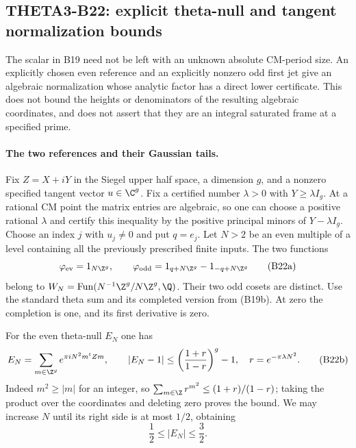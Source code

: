 \subsection{THETA3-B22: explicit theta-null and tangent normalization bounds}\label{B22}

The scalar in B19 need not be left with an unknown absolute
CM-period size.  An explicitly chosen even reference and an
explicitly nonzero odd first jet give an algebraic normalization
whose analytic factor has a direct lower certificate.  This
does not bound the heights or denominators of the resulting
algebraic coordinates, and does not assert that they are an
integral saturated frame at a specified prime.

\paragraph{The two references and their Gaussian tails.}
Fix $Z=X+iY$ in the Siegel upper half space, a dimension $g$,
and a nonzero specified tangent vector $u\in\C^g$.
Fix a certified number $\lambda>0$ with $Y\geq\lambda I_g$.
At a rational CM point the matrix entries are algebraic, so
one can choose a positive rational $\lambda$ and certify this
inequality by the positive principal minors of $Y-\lambda I_g$.
Choose an index $j$ with $u_j\ne0$ and put $q=e_j$.
Let $N>2$ be an even multiple of a level containing all the
previously prescribed finite inputs.  The two functions
\[
 \varphi_{\rm ev}=1_{N\Z^g},\qquad
 \varphi_{\rm odd}=1_{q+N\Z^g}-1_{-q+N\Z^g}
 \tag{B22a}
\]
belong to $W_N=\operatorname{Fun}(N^{-1}\Z^g/N\Z^g,\Q)$.
Their two odd cosets are distinct.  Use the standard theta
sum and its completed version from (B19b).  At zero the
completion is one, and its first derivative is zero.

For the even theta-null $E_N$ one has
\[
 E_N=\sum_{m\in\Z^g}e^{\pi iN^2m^tZm},\qquad
 |E_N-1|\leq
       \left(\frac{1+r}{1-r}\right)^g-1,
 \quad r=e^{-\pi\lambda N^2}.
 \tag{B22b}
\]
Indeed $m^2\geq |m|$ for an integer, so
$\sum_{m\in\Z}r^{m^2}\leq(1+r)/(1-r)$; taking the
product over the coordinates and deleting zero proves the
bound.  We may increase $N$ until its right side is at most
$1/2$, obtaining
\[
                         \frac12\leq |E_N|\leq\frac32.
 \tag{B22c}
\]

